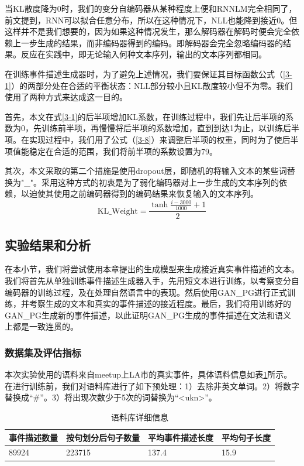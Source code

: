 当KL散度降为0时，我们的变分自编码器从某种程度上便和RNNLM完全相同了，前文提到，RNN可以拟合任意分布，所以在这种情况下，NLL也能降到接近0。但这样并不是我们想要的，因为如果这种情况发生，那么解码器在解码时便会完全依赖上一步生成的结果，而非编码器得到的编码。即解码器会完全忽略编码器的结果。反应在实践中，即无论输入何种文本序列，输出的文本序列都相同。

在训练事件描述生成器时，为了避免上述情况，我们要保证其目标函数公式（\ref{3-1}）的两部分处在合适的平衡状态：NLL部分较小且KL散度较小但不为零。我们使用了两种方式来达成这一目的。

首先，本文在式\ref{3-1}的后半项增加KL系数，在训练过程中，我们先让后半项的系数为0，先训练前半项，再慢慢将后半项的系数增加，直到到达1为止，以训练后半项。在实现过程中，我们用了公式（\ref{3-8}）来调整后半项的权重，同时为了使后半项值能稳定在合适的范围，我们将前半项的系数设置为79。

其次，本文采取的第二个措施是使用dropout层，即随机的将输入文本的某些词替换为"\_"。采用这种方式的初衷是为了弱化编码器对上一步生成的文本序列的依赖，以迫使其使用之前编码器得到的编码结果来恢复输入的文本序列。
\begin{equation}\label{3-8}
    \mathrm{KL\_Weight}=\frac{\tanh\frac{i-3000}{1000}+1}{2}
\end{equation}

\subsection{实验结果和分析}
在本小节，我们将尝试使用本章提出的生成模型来生成接近真实事件描述的文本。我们将首先从单独训练事件描述生成器入手，先用短文本进行训练，以考察变分自编码器的训练过程，及在处理自然语言中的表现。然后使用GAN\_PG进行正式训练，并考察生成的文本和真实的事件描述的接近程度。最后，我们将用训练好的GAN\_PG生成新的事件描述，以此证明GAN\_PG生成的事件描述在文法和语义上都是一致连贯的。
\subsubsection{数据集及评估指标}
本次实验使用的语料来自meetup上LA市的真实事件，具体语料信息如表\ref{t3-1}所示。在进行训练前，我们对语料库进行了如下预处理：1）去除非英文单词。2）将数字替换成“\#”。3）将出现次数少于5次的词替换为“<ukn>”。
\begin{table}[htb]
    \caption{\label{t3-1} 语料库详细信息}
    \center
    \begin{tabular*}{\linewidth}{p{.25\linewidth}p{.25\linewidth}p{.25\linewidth}p{.25\linewidth}}
    \toprule
    事件描述数量&按句划分后句子数量&平均事件描述长度&平均句子长度 \\
    \midrule 
    89924&223715&137.4&15.9 \\
    \bottomrule 
    \end{tabular*}
\end{table}

